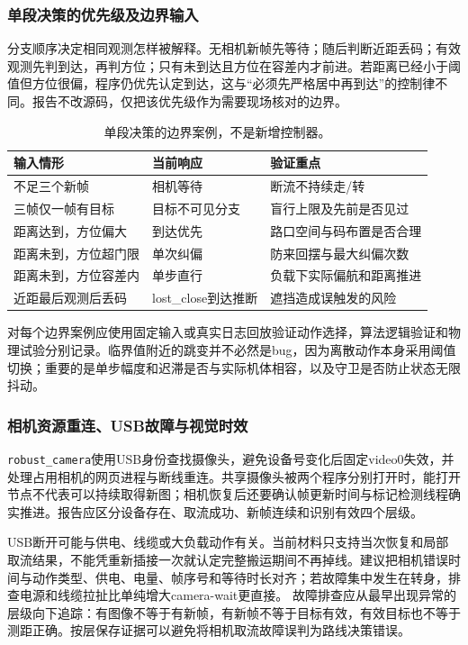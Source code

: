 \subsubsection{单段决策的优先级及边界输入}
分支顺序决定相同观测怎样被解释。无相机新帧先等待；随后判断近距丢码；有效观测先判到达，再判方位；只有未到达且方位在容差内才前进。若距离已经小于阈值但方位很偏，程序仍优先认定到达，这与“必须先严格居中再到达”的控制律不同。报告不改源码，仅把该优先级作为需要现场核对的边界。
\begin{table}[H]\centering\small\begin{tabularx}{\linewidth}{p{28mm}YY}\toprule 输入情形 & 当前响应 & 验证重点\\\midrule
不足三个新帧 & 相机等待 & 断流不持续走/转\\
三帧仅一帧有目标 & 目标不可见分支 & 盲行上限及先前是否见过\\
距离达到，方位偏大 & 到达优先 & 路口空间与码布置是否合理\\
距离未到，方位超门限 & 单次纠偏 & 防来回摆与最大纠偏次数\\
距离未到，方位容差内 & 单步直行 & 负载下实际偏航和距离推进\\
近距最后观测后丢码 & lost\_close到达推断 & 遮挡造成误触发的风险\\\bottomrule\end{tabularx}\caption{单段决策的边界案例，不是新增控制器。}\end{table}
对每个边界案例应使用固定输入或真实日志回放验证动作选择，算法逻辑验证和物理试验分别记录。临界值附近的跳变并不必然是bug，因为离散动作本身采用阈值切换；重要的是单步幅度和迟滞是否与实际机体相容，以及守卫是否防止状态无限抖动。

\subsubsection{相机资源重连、USB故障与视觉时效}
\texttt{robust\_\allowbreak camera}使用USB身份查找摄像头，避免设备号变化后固定video0失效，并处理占用相机的网页进程与断线重连。共享摄像头被两个程序分别打开时，能打开节点不代表可以持续取得新图；相机恢复后还要确认帧更新时间与标记检测线程确实推进。报告应区分设备存在、取流成功、新帧连续和识别有效四个层级。

USB断开可能与供电、线缆或大负载动作有关。当前材料只支持当次恢复和局部取流结果，不能凭重新插接一次就认定完整搬运期间不再掉线。建议把相机错误时间与动作类型、供电、电量、帧序号和等待时长对齐；若故障集中发生在转身，排查电源和线缆拉扯比单纯增大camera-wait更直接。
故障排查应从最早出现异常的层级向下追踪：有图像不等于有新帧，有新帧不等于目标有效，有效目标也不等于测距正确。按层保存证据可以避免将相机取流故障误判为路线决策错误。

